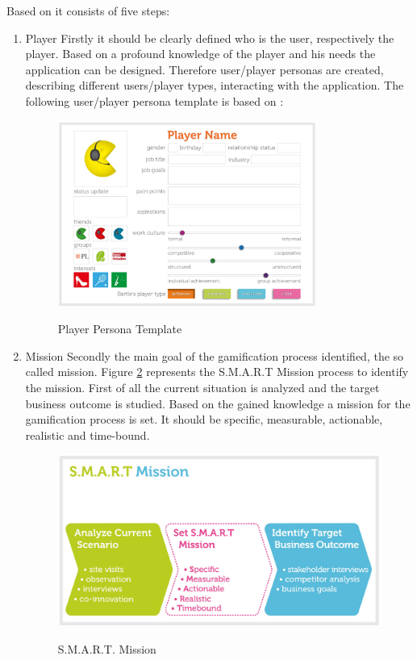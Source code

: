 Based on \cite[p. 29-32]{inproceedings} it consists of five steps:
\begin{enumerate}
	\item Player \newline
	Firstly it should be clearly defined who is the user, respectively the player. Based on a profound knowledge of the player and his needs the application can be designed. Therefore user/player personas are created, describing different users/player types, interacting with the application. The following user/player persona template is based on \cite[p. 38-45]{inproceedings}:

	\begin{figure}[htbp] 
		\centering
		\includegraphics[width=0.8\textwidth]{Content/Theory/PlayerPersona.png}
		\caption{Player Persona Template}
		\cite[p. 46]{inproceedings}
		\label{fig:playerPersonaTemplate}
	\end{figure}
	
	\item Mission \newline
	Secondly the main goal of the gamification process identified, the so called mission. Figure \ref{fig:smartMission} represents the S.M.A.R.T Mission process to identify the mission. First of all the current situation is analyzed and the target business outcome is studied. Based on the gained knowledge a mission for the gamification process is set. It should be specific, measurable, actionable, realistic and time-bound. \cite[p. 49-52]{inproceedings}
	
	\begin{figure}[htbp] 
		\centering
		\includegraphics[width=1.0\textwidth]{Content/Theory/SmartMission.png}
		\caption{S.M.A.R.T. Mission}
		\cite[p. 50]{inproceedings}
		\label{fig:smartMission}
	\end{figure}


\end{enumerate}
